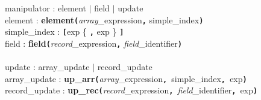 \documentclass{article}
\begin{document}
\begin{tabbing}
manipulator : element $\mid$ field $\mid$ update \\
element : \textbf{element\texttt{(}}\textit{array}\_expression\textbf{\texttt{,}}
simple\_index\textbf{\texttt{)}} \\
simple\_index : \textbf{\texttt{[}}exp \{ \textbf{\texttt{,}} exp \}
\textbf{\texttt{]}} \\
field : \textbf{field\texttt{(}}\textit{record}\_expression\textbf{\texttt{,}}
\textit{field}\_identifier\textbf{\texttt{)}} \\
\\
update : array\_update $\mid$ record\_update \\
array\_update :
\textbf{up\_arr\texttt{(}}\textit{array}\_expression\textbf{\texttt{,
}}simple\_index\textbf{\texttt{, }}exp\textbf{\texttt{)}} \\
record\_update :
\textbf{up\_rec\texttt{(}}\textit{record}\_expression\textbf{\texttt{,
}}\textit{field}\_identifier\textbf{\texttt{, }}exp\textbf{\texttt{)}} \\


\end{tabbing}


\end{document}
